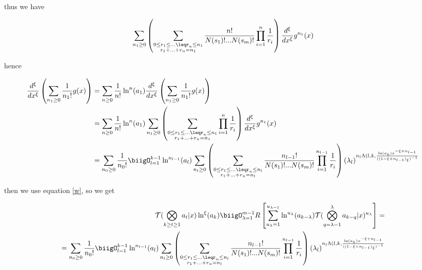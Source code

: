 thus we have

\begin{align}
        \sum_{n_1\geq0} \left(\sum_{\substack{0\leq
        r_1 \leq...\leqr_n\leq n_1 \\ r_1 +...+r_n =
        n_1}}\frac{n!}{N(s_1)!...N(s_m)!}\prod_{i=1}^n
        \frac{1}{r_i}\right)\frac{d^\xi}{dx^\xi}g^{n_1}(x)
\end{align}

hence

\begin{align}
        \frac{d^\xi}{dx^\xi}\left(\sum_{n_1\geq0}\frac{1}{
        n_1!}g(x)\right) &=\sum_{n\geq0}\frac{1}{n!}\ln^n(
        a_1) \frac{d^\xi}{dx^\xi}\left(\sum_{n_1\geq0}\frac{1}{
        n_1!}g(x)\right) \\
        &=\sum_{n\geq 0}\frac{1}{n!}\ln^n(a_1)\sum_{n_1\geq0}
        \left(\sum_{\substack{0\leq r_1 \leq...\leqr_n\leq n_1 
        \\ r_1 +...+r_n = n_1}}\prod_{i=1}^n \frac{1}{r_i}\right)
        \frac{d^\xi}{dx^\xi}g^{n_1}(x) \\
        & =\sum_{n_0\geq 0}\frac{1}{n_0!}\biigO_{l=1}^{k-1}
        \ln^{n_{l-1}}(a_l)
        \sum_{n_l\geq0} \left(\sum_{\substack{0\leq r_1 \leq...
        \leqr_n\leq n_l \\ r_1 +...+r_n = n_l}}\frac{n_{l-1}!}{
        N(s_1)!...N(s_m)!}\prod_{i=1}^{n_{l-1}} \frac{1}{r_i}
        \right)(\lambda_l)^{n_l \Lambda(l, k,\frac{\ln(a_k)x^{
        -\xi+n_{l-1}}}{((1-\xi + n_{l-1})_\xi)^{-1}}}
\end{align}

then we use equation \ref{w}, so we get

\begin{align}
        \mathcal{T}(\bigotimes_{k \geq t \geq 1}a_t| x) 
        \ln^\xi (a_k) \biigO_{\lambda = 1}^{m-1} R\left[
        \sum_{u_{\lambda}=1}^{u_{\lambda-1}}\ln^{u_{
        \lambda}}(a_{k-\lambda}) \mathcal{T}(\bigotimes_{
        q = \lambda-1}^\lambda a_{k-q} |x)^{u_{\lambda}} 
        \right] = \\=\sum_{n_0\geq 0}\frac{1}{n_0!}\biigO_{l=1}^{k-1}
        \ln^{n_{l-1}}(a_l)
        \sum_{n_l\geq0} \left(\sum_{\substack{0\leq r_1 
        \leq...\leqr_n\leq n_l \\ r_1 +...+r_n = n_l}}
        \frac{n_{l-1}!}{N(s_1)!...N(s_m)!}\prod_{i=1}^{n_{l-1}}
        \frac{1}{r_i}\right)(\lambda_l)^{n_l \Lambda(l, k,\frac{
        \ln(a_k)x^{-\xi+n_{l-1}}}{((1-\xi + n_{l-1})_\xi)^{-1}}}
\end{align}


